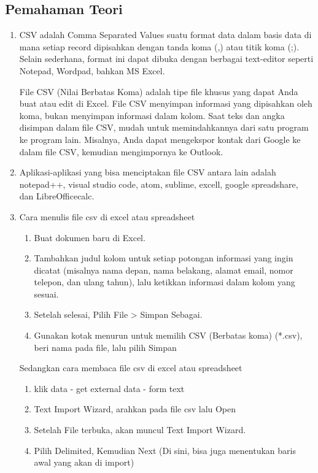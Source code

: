 \subsection{Pemahaman Teori}
\begin{enumerate}
    \item CSV adalah Comma Separated Values suatu format data dalam basis data di mana setiap record dipisahkan dengan tanda koma (,) atau titik koma (;). Selain sederhana, format ini dapat dibuka dengan berbagai text-editor seperti Notepad, Wordpad, bahkan MS Excel.
    \par File CSV (Nilai Berbatas Koma) adalah tipe file khusus yang dapat Anda buat atau edit di Excel. File CSV menyimpan informasi yang dipisahkan oleh koma, bukan menyimpan informasi dalam kolom. Saat teks dan angka disimpan dalam file CSV, mudah untuk memindahkannya dari satu program ke program lain. Misalnya, Anda dapat mengekspor kontak dari Google ke dalam file CSV, kemudian mengimpornya ke Outlook.
    \item Aplikasi-aplikasi yang bisa menciptakan file CSV antara lain adalah notepad++, visual studio code, atom, sublime, excell, google spreadshare, dan LibreOfficecalc.
    \item Cara menulis file csv di excel atau spreadsheet
    \begin{enumerate}
        \item Buat dokumen baru di Excel.
        \item Tambahkan judul kolom untuk setiap potongan informasi yang ingin dicatat (misalnya nama depan, nama belakang, alamat email, nomor telepon, dan ulang tahun), lalu ketikkan informasi dalam kolom yang sesuai.
        \item Setelah selesai, Pilih File > Simpan Sebagai.
        \item Gunakan kotak menurun untuk memilih CSV (Berbatas koma) (*.csv), beri nama pada file, lalu pilih Simpan
    \end{enumerate}
    \par Sedangkan cara membaca file csv di excel atau spreadsheet
    \begin{enumerate}
        \item klik data - get external data - form text
        \item Text Import Wizard, arahkan pada file csv lalu Open
        \item Setelah File terbuka, akan muncul Text Import Wizard.
        \item Pilih Delimited, Kemudian Next (Di sini, bisa juga menentukan baris awal yang akan di import)

\end{enumerate}
\end{enumerate}
